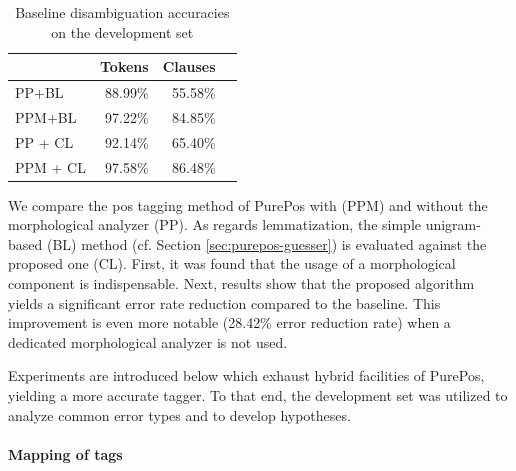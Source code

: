 \begin{table}[ht]
\centering
\caption{Baseline disambiguation accuracies on the development set}\label{tab:oldhun-baselines}
\begin{tabular}{l r r r}
\hline
 & Tokens & Clauses \\
\hline
PP+BL  & 88.99\% & 55.58\% \\
PPM+BL  & 97.22\% & 84.85\% \\
PP + CL & 92.14\% & 65.40\% \\
PPM + CL & 97.58\% & 86.48\% \\
\hline
\end{tabular}
\end{table}




We compare the \gls{pos} tagging method of PurePos with (PPM) and without the morphological analyzer (PP).
As regards lemmatization, the simple unigram-based (BL) method (cf. Section \ref{sec:purepos-guesser}) is evaluated against the proposed one (CL). 
First, it was found that the usage of a morphological component is indispensable. 
Next, results show that the proposed algorithm yields a significant error rate reduction compared to the baseline. 
This improvement is even more notable  (28.42\% error reduction rate) when a dedicated morphological analyzer is not used.

Experiments are introduced below which exhaust hybrid facilities of PurePos, yielding a more accurate tagger. 
To that end, the development set was utilized to analyze common error types and to develop hypotheses.

\paragraph{Mapping of tags}

